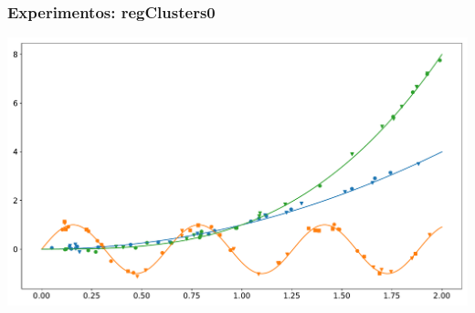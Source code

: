 \documentclass[aspectratio=43,spanish]{beamer}
\newcommand{\fdata}[1]{\textsf{#1}}
\begin{document}
\begin{frame}
{\begin{tabular}{l*{5}{c}}
               \bottomrule
              \end{tabular}
          }
      

\end{frame}


\begin{frame}
      \frametitle{Experimentos: \fdata{regClusters0}}

      \centering
      \includegraphics[width=.8\textwidth]{Chapter6/IGPL2022/regClusters__0.pdf}%
      

\end{frame}





\end{document}

